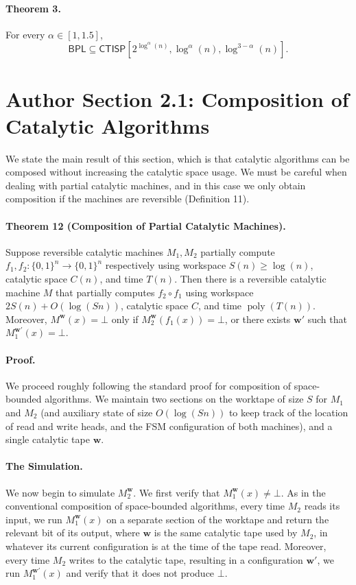 \paragraph{Theorem 3.} For every $\alpha\in[1,1.5]$,
\[\mathsf{BPL}\subseteq\mathsf{CTISP}[2^{\log^\alpha(n)},\log^\alpha(n),\log^{3-\alpha}(n)].\]
\section*{Author Section 2.1: Composition of Catalytic Algorithms}
We state the main result of this section, which is that catalytic algorithms can be composed without increasing the catalytic space usage. We must be careful when dealing with partial catalytic machines, and in this case we only obtain composition if the machines are reversible (Definition 11).
\paragraph{Theorem 12 (Composition of Partial Catalytic Machines).} Suppose reversible catalytic machines $M_1,M_2$ partially compute $f_1,f_2:\{0,1\}^n\to\{0,1\}^n$ respectively using workspace $S(n)\geq\log(n)$, catalytic space $C(n)$, and time $T(n)$. Then there is a reversible catalytic machine $M$ that partially computes $f_2\circ f_1$ using workspace $2S(n)+O(\log(Sn))$, catalytic space $C$, and time $\operatorname{poly}(T(n))$. Moreover, $M^{\mathbf w}(x)=\bot$ only if $M_2^{\mathbf w}(f_1(x))=\bot$, or there exists $\mathbf w'$ such that $M_1^{\mathbf w'}(x)=\bot$.
\paragraph{Proof.} We proceed roughly following the standard proof for composition of space-bounded algorithms. We maintain two sections on the worktape of size $S$ for $M_1$ and $M_2$ (and auxiliary state of size $O(\log(Sn))$ to keep track of the location of read and write heads, and the FSM configuration of both machines), and a single catalytic tape $\mathbf w$.
\paragraph{The Simulation.} We now begin to simulate $M_2^{\mathbf w}$. We first verify that $M_1^{\mathbf w}(x)\neq\bot$. As in the conventional composition of space-bounded algorithms, every time $M_2$ reads its input, we run $M_1^{\mathbf w}(x)$ on a separate section of the worktape and return the relevant bit of its output, where $\mathbf w$ is the same catalytic tape used by $M_2$, in whatever its current configuration is at the time of the tape read. Moreover, every time $M_2$ writes to the catalytic tape, resulting in a configuration $\mathbf w'$, we run $M_1^{\mathbf w'}(x)$ and verify that it does not produce $\bot$.
